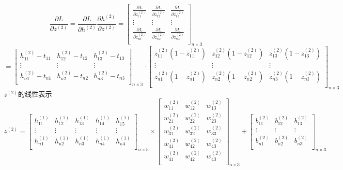 \documentclass{article}
\begin{document}
	$$\frac{\partial L}{\partial z^{(2)}}=\frac{\partial L}{\partial h^{(2)}}\frac{\partial h^{(2)}}{\partial z^{(2)}}
	=\left[                 
	\begin{array}{ccc}  
	\frac{\partial L}{\partial z^{(2)}_{11}} & \frac{\partial L}{\partial z^{(2)}_{12}} & \frac{\partial L}{\partial z^{(2)}_{13}} \\  
	\vdots & \vdots & \vdots \\ 
	\frac{\partial L}{\partial z^{(2)}_{n1}} & \frac{\partial L}{\partial z^{(2)}_{n2}} & \frac{\partial L}{\partial z^{(2)}_{n3}}  \\  
	\end{array}
	\right]_{n\times3}
	$$
	$$=\left[                 
	\begin{array}{ccc}  
	h^{(2)}_{11}-t_{11} & h^{(2)}_{12}-t_{12} & h^{(2)}_{13}-t_{13} \\  
	\vdots & \vdots & \vdots \\ 
	h^{(2)}_{n1}-t_{n1} & h^{(2)}_{n2}-t_{n2} & h^{(2)}_{n3}-t_{n3} \\  
	\end{array}
	\right]_{n\times3}\cdot\left[                 
	\begin{array}{ccc}  
	z_{11}^{(2)}(1-z_{11}^{(2)}) & z_{12}^{(2)}(1-z_{12}^{(2)}) & z_{13}^{(2)}(1-z_{13}^{(2)}) \\  
	\vdots & \vdots & \vdots \\ 
	z_{n1}^{(2)}(1-z_{n1}^{(2)}) & z_{n2}^{(2)}(1-z_{n2}^{(2)}) & z_{n3}^{(2)}(1-z_{n3}^{(2)}) \\ 
	\end{array}
	\right]_{n\times3}
	$$
	$z^{(2)}$的线性表示
	$$
	z^{(2)}=\left[                 
	\begin{array}{ccccc}  
	h^{(1)}_{11} & h^{(1)}_{12} & h^{(1)}_{13} & h^{(1)}_{14} & h^{(1)}_{15}\\  
	\vdots & \vdots & \vdots & \vdots & \vdots\\ 
	h^{(1)}_{n1} & h^{(1)}_{n2} & h^{(1)}_{n3} & h^{(1)}_{n4} & h^{(1)}_{n4}\\ 
	\end{array}
	\right]_{n\times5} \times \left[                 
	\begin{array}{ccc}  
	w^{(2)}_{11} & w^{(2)}_{12} & w^{(2)}_{13} \\  
	w^{(2)}_{21} & w^{(2)}_{22} & w^{(2)}_{23} \\  
	w^{(2)}_{31} & w^{(2)}_{32} & w^{(2)}_{33} \\ 
	w^{(2)}_{41} & w^{(2)}_{42} & w^{(2)}_{43} \\ 
	w^{(2)}_{41} & w^{(2)}_{42} & w^{(2)}_{43} \\ 
	\end{array}
	\right]_{5\times3}+\left[                 
	\begin{array}{ccccc}  
	b^{(2)}_{11} & b^{(2)}_{12} & b^{(2)}_{13} \\  
	\vdots & \vdots & \vdots \\ 
	b^{(2)}_{n1} & b^{(2)}_{n2} & b^{(2)}_{n3} \\ 
	\end{array}
	\right]_{n\times3}
	$$
\end{document}
